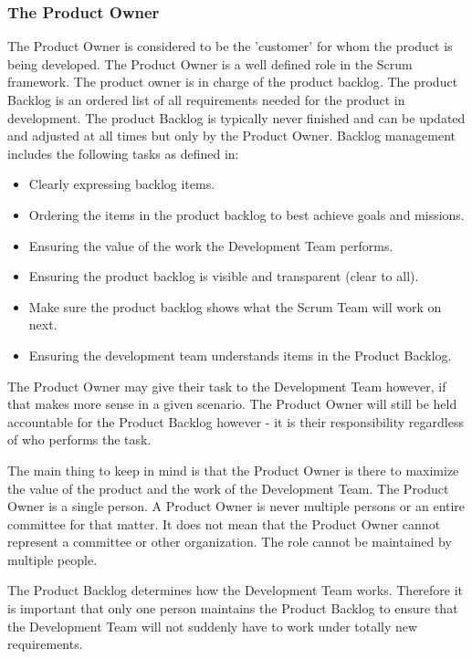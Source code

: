 \subsubsection{The Product Owner}


The Product Owner is considered to be the 'customer' for whom the product is being developed.
The Product Owner is a well defined role in the Scrum framework. The product owner is in charge of the product backlog\cite{scrumguide11}. The product Backlog is an ordered list of all requirements needed for the product in development. The product Backlog is typically never finished and can be updated and adjusted at all times but only by the Product Owner\cite{scrumguide11}. Backlog management includes the following tasks as defined in\cite{scrumguide11}:

\begin{itemize}
	\item Clearly expressing backlog items.
	\item	Ordering the items in the product backlog to best achieve goals and missions.
	\item	Ensuring the value of the work the Development Team performs.
	\item	Ensuring the product backlog is visible and transparent (clear to all).
	\item	Make sure the product backlog shows what the Scrum Team will work on next.
	\item	Ensuring the development team understands items in the Product Backlog.
\end{itemize}


The Product Owner may give their task to the Development Team however, if that makes more sense in a given scenario\cite{scrumguide11}. The Product Owner will still be held accountable for the Product Backlog however - it is their responsibility regardless of who performs the task\cite{scrumguide11}.


The main thing to keep in mind is that the Product Owner is there to maximize the value of the product and the work of the Development Team\cite{scrumguide11}.  The Product Owner is a single person. A Product Owner is never multiple persons or an entire committee for that matter. It does not mean that the Product Owner cannot represent a committee or other organization\cite{scrumguide11}. The role cannot be maintained by multiple people\cite{scrumguide11}.


The Product Backlog determines how the Development Team works. Therefore it is important that only one person maintains the Product Backlog to ensure that the Development Team will not suddenly have to work under totally new requirements\cite{scrumguide11}.

